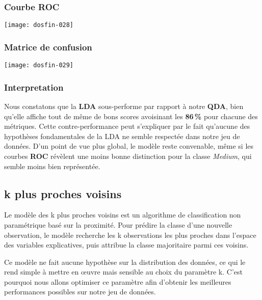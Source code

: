 \documentclass[a4paper,11pt]{article}
\begin{document}
\subsubsection{Courbe ROC}

\begin{center}

\texttt{[image: dosfin-028]}

\end{center}

\subsubsection{Matrice de confusion}

\begin{center}

\texttt{[image: dosfin-029]}

\end{center}

\subsubsection{Interpretation}

Nous constatons que la \textbf{LDA} sous-performe par rapport à notre \textbf{QDA}, bien qu’elle affiche tout de même de bons scores avoisinant les \textbf{86\,\%} pour chacune des métriques. Cette contre-performance peut s’expliquer par le fait qu’aucune des hypothèses fondamentales de la LDA ne semble respectée dans notre jeu de données. D’un point de vue plus global, le modèle reste convenable, même si les courbes \textbf{ROC} révèlent une moins bonne distinction pour la classe \textit{Medium}, qui semble moins bien représentée.

\newpage


\subsection{k plus proches voisins}

Le modèle des k plus proches voisins est un algorithme de classification non paramétrique basé sur la proximité. Pour prédire la classe d'une nouvelle observation, le modèle recherche les k observations les plus proches dans l'espace des variables explicatives, puis attribue la classe majoritaire parmi ces voisins.

Ce modèle ne fait aucune hypothèse sur la distribution des données, ce qui le rend simple à mettre en œuvre mais sensible au choix du paramètre k. C'est pourquoi nous allons optimiser ce paramètre afin d'obtenir les meilleures performances possibles sur notre jeu de données.
\end{document}
